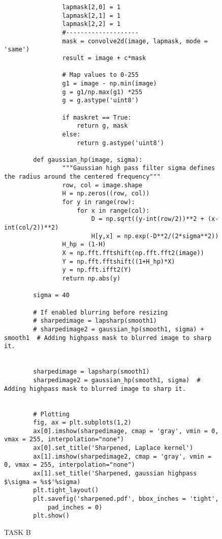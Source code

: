 {\begin{figure}[hbt!]
\begin{lstlisting}
                lapmask[2,0] = 1
                lapmask[2,1] = 1
                lapmask[2,2] = 1
                #--------------------
                mask = convolve2d(image, lapmask, mode = 'same')
                result = image + c*mask
        
                # Map values to 0-255
                g1 = image - np.min(image)
                g = g1/np.max(g1) *255
                g = g.astype('uint8')
        
                if maskret == True:
                    return g, mask
                else:
                    return g.astype('uint8')
        
        def gaussian_hp(image, sigma):
                """Gaussian high pass filter sigma defines the radius around the centered frequency"""
                row, col = image.shape
                H = np.zeros((row, col))
                for y in range(row):
                    for x in range(col):
                        D = np.sqrt((y-int(row/2))**2 + (x-int(col/2))**2)
                        H[y,x] = np.exp(-D**2/(2*sigma**2))
                H_hp = (1-H)
                X = np.fft.fftshift(np.fft.fft2(image))
                Y = np.fft.fftshift((1+H_hp)*X)
                y = np.fft.ifft2(Y)
                return np.abs(y)
        
        sigma = 40
        
        # If enabled blurring before resizing
        # sharpedimage = lapsharp(smooth1)
        # sharpedimage2 = gaussian_hp(smooth1, sigma) + smooth1  # Adding highpass mask to blurred image to sharp it.
        
        
        sharpedimage = lapsharp(smooth1)
        sharpedimage2 = gaussian_hp(smooth1, sigma)  # Adding highpass mask to blurred image to sharp it.
        
        
        # Plotting
        fig, ax = plt.subplots(1,2)
        ax[0].imshow(sharpedimage, cmap = 'gray', vmin = 0, vmax = 255, interpolation="none")
        ax[0].set_title('Sharpened, Laplace kernel')
        ax[1].imshow(sharpedimage2, cmap = 'gray', vmin = 0, vmax = 255, interpolation="none")
        ax[1].set_title('Sharpened, gaussian highpass $\sigma = %s$'%sigma)
        plt.tight_layout()
        plt.savefig('sharpened.pdf', bbox_inches = 'tight',
            pad_inches = 0)
        plt.show()        
    \end{lstlisting}
\caption{TASK B}
\label{TASK B}
\end{figure}



}
